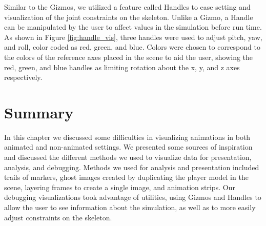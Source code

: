 Similar to the Gizmos, we utilized a feature called Handles to ease setting and visualization of the joint constraints on the skeleton.  Unlike a Gizmo, a Handle can be manipulated by the user to affect values in the simulation before run time.  As shown in Figure \ref{fig:handle_vis}, three handles were used to adjust pitch, yaw, and roll, color coded as red, green, and blue.  Colors were chosen to correspond to the colors of the reference axes placed in the scene to aid the user, showing the red, green, and blue handles as limiting rotation about the x, y, and z axes respectively.

\section{Summary}
In this chapter we discussed some difficulties in visualizing animations in both animated and non-animated settings.  We presented some sources of inspiration and discussed the different methods we used to visualize data for presentation, analysis, and debugging.  Methods we used for analysis and presentation included trails of markers, ghost images created by duplicating the player model in the scene, layering frames to create a single image, and animation strips.  Our debugging visualizations took advantage of \unity utilities, using Gizmos and Handles to allow the user to see information about the simulation, as well as to more easily adjust constraints on the skeleton.
\label{section:vis_summary}
